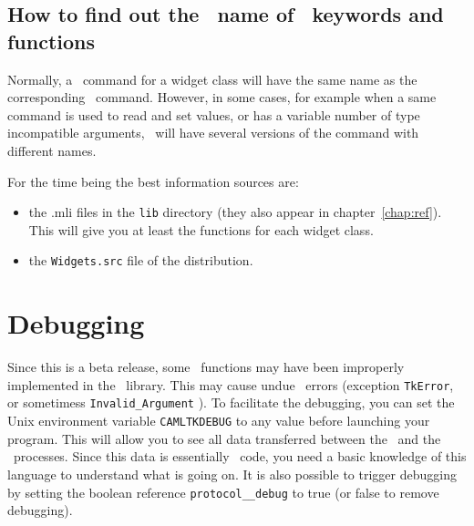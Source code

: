 \subsection{How to find out the \caml\ name of \tk\ keywords and functions}
Normally, a \caml\ command for a widget class will have the same name as the
corresponding \tk\ command. However, in some cases, for example when a same
command is used to read and set values, or has a variable number of type
incompatible arguments, \camltk\ will have several versions of the command
with different names.

For the time being the best information sources are:
\begin{itemize}
\item  the .mli files in the \verb|lib| directory (they also appear in
chapter~\ref{chap:ref}). This will give you at least the functions for each
widget class. 

\item  the \verb|Widgets.src| file of the distribution. 

\end{itemize} 

\section{Debugging}
Since this is a beta release, some \tk\ functions may have been improperly
implemented in the \camltk\ library. This may cause undue \tk\ errors
(exception \verb|TkError|, or sometimess \verb|Invalid_Argument| ). To
facilitate the debugging, you can set the 
Unix environment variable \verb|CAMLTKDEBUG| to any value before launching
your program. This will allow you to see all
data transferred between the \caml\ and the \tk\ processes. Since this data is
essentially \tcl\tk\ code, you need a basic knowledge of this language to
understand what is going on.
It is also possible to trigger debugging by setting the boolean reference
\verb|protocol__debug| to true (or false to remove debugging).
